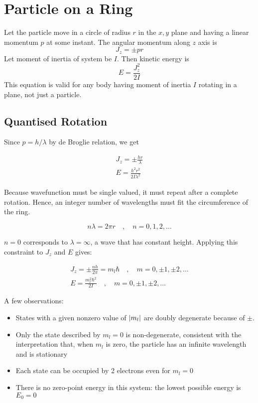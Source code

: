 \documentclass[11pt]{article}
\theoremstyle{definition}
\begin{document}
\section{Particle on a Ring}
Let the particle move in a circle of radius $r$ in the $x,y$ plane and having a linear momentum $p$ at some instant. The angular momentum along $z$ axis is $$J_z = \pm pr$$ Let moment of inertia of system be $I$. Then kinetic energy is $$E = \frac{J_z^2}{2I}$$ This equation is valid for any body having moment of inertia $I$ rotating in a plane, not just a particle.


\subsection{Quantised Rotation}

Since $p = h/ \lambda$ by de Broglie relation, we get

\begin{gather*}
    J_z = \pm \frac{hr}{\lambda}\\
    E = \frac{h^2 r^2}{2I\lambda^2}
\end{gather*}

Because wavefunction must be single valued, it must repeat after a complete rotation. Hence, an
integer number of wavelengths must fit the circumference of
the ring.

\begin{equation*}
    n\lambda = 2\pi r \quad , \quad n = 0,1,2,\dots
\end{equation*}

$n=0$ corresponds to $\lambda = \infty$, a wave that has constant height. Applying this constraint to $J_z$ and $E$ gives:

\begin{gather*}
    J_z = \pm \frac{n h}{2\pi} = m_l \hbar \quad, \quad m = 0, \pm 1, \pm 2, \dots \\
    E = \frac{m_l^2 \hbar^2}{2I} \quad , \quad m = 0, \pm 1, \pm 2, \dots
\end{gather*}

A few observations:
\begin{itemize}
    \item States with a given nonzero value of $\abs{m_l}$ are doubly degenerate because of $\pm$.
    \item Only the state described by $m_l = 0$ is non-degenerate, consistent with the interpretation that, when $m_l$ is zero, the particle has an infinite wavelength and is stationary
    \item Each state can be occupied by 2 electrons even for $m_l = 0$
    \item There is no zero-point energy in this system: the lowest possible energy is $E_0 = 0$
\end{itemize}
\end{document}

